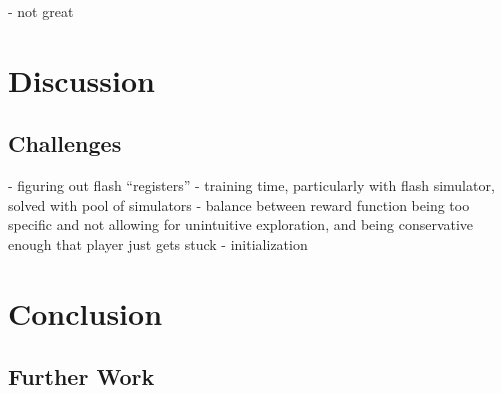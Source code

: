 \documentclass[12pt]{article}
\begin{document}
- not great

\section{Discussion}

\subsection{Challenges}

- figuring out flash ``registers''
- training time, particularly with flash simulator, solved with pool of simulators
- balance between reward function being too specific and not allowing for unintuitive exploration, and being conservative enough that player just gets stuck
- initialization

\section{Conclusion}

\subsection{Further Work}

\pagebreak
\printbibliography
\end{document}
